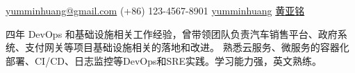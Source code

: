 \documentclass{resume}
\begin{document}
{\href{mailto:yumminhuang@gmail.com}{yumminhuang@gmail.com}}
{(+86) 123-4567-8901}
{\href{https://github.com/yumminhuang}{yumminhuang}}
{\href{https://www.linkedin.com/in/yaming-huang-6a09325b/zh-cn}{黄亚铭}}
{}


\begin{body}
四年 DevOps 和基础设施相关工作经验，曾带领团队负责汽车销售平台、政府系统、支付网关等项目基础设施相关的落地和改进。
熟悉云服务、微服务的容器化部署、CI/CD、日志监控等DevOps和SRE实践。学习能力强，英文熟练。
\smallskip
\end{body}

\end{document}
